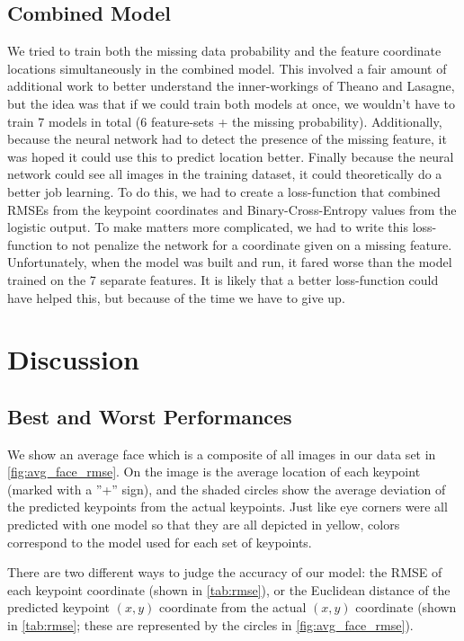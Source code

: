 \documentclass{article}
\begin{document}
\subsection{Combined Model}

We tried to train both the missing data probability and the feature coordinate locations simultaneously in the combined model. This involved a fair amount of additional work to better understand the inner-workings of Theano and Lasagne, but the idea was that if we could train both models at once, we wouldn't have to train 7 models in total (6 feature-sets + the missing probability).  Additionally, because the neural network had to detect the presence of the missing feature, it was hoped it could use this to predict location better. Finally because the neural network could see all images in the training dataset, it could theoretically do a better job learning.  To do this, we had to create a loss-function that combined RMSEs from the keypoint coordinates and Binary-Cross-Entropy values from the logistic output.  To make matters more complicated, we had to write this loss-function to not penalize the network for a coordinate given on a missing feature.  Unfortunately, when the model was built and run, it fared worse than the model trained on the 7 separate features. It is likely that a better loss-function could have helped this, but because of the time we have to give up.

\section{Discussion}

\subsection{Best and Worst Performances}

We show an average face which is a composite of all images in our data set in \ref{fig:avg_face_rmse}. On the image is the average location of each keypoint (marked with a ''+'' sign), and the shaded circles show the average deviation of the predicted keypoints from the actual keypoints.   Just like eye corners were all predicted with one model so that they are all depicted in yellow, colors correspond to the model used for each set of keypoints.

There are two different ways to judge the accuracy of our model: the RMSE of each keypoint coordinate (shown in \ref{tab:rmse}), or the Euclidean distance of the predicted keypoint $(x,y)$ coordinate from the actual $(x,y)$ coordinate (shown in \ref{tab:rmse}; these are represented by the circles in \ref{fig:avg_face_rmse}).
\end{document}
